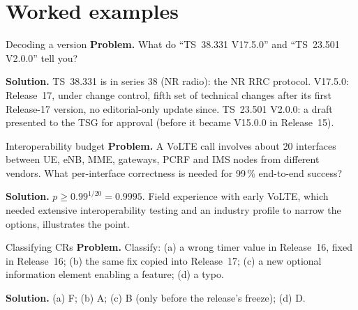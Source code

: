 \documentclass[11pt,a4paper]{article}
\begin{document}
\section{Worked examples}

\begin{examplebox}{Decoding a version}\label{ex:version}
\textbf{Problem.} What do ``TS~38.331 V17.5.0'' and ``TS~23.501 V2.0.0'' tell you?

\textbf{Solution.} TS~38.331 is in series 38 (NR radio): the NR RRC protocol. V17.5.0: Release~17, under change control,
fifth set of technical changes after its first Release-17 version, no editorial-only update since. TS~23.501 V2.0.0: a draft
presented to the TSG for approval (before it became V15.0.0 in Release~15).
\end{examplebox}

\begin{examplebox}{Interoperability budget}\label{ex:interop}
\textbf{Problem.} A VoLTE call involves about 20 interfaces between UE, eNB, MME, gateways, PCRF and IMS nodes from
different vendors. What per-interface correctness is needed for 99\,\% end-to-end success?

\textbf{Solution.} $p \ge 0.99^{1/20} = 0.9995$. Field experience with early VoLTE, which needed extensive interoperability
testing and an industry profile to narrow the options, illustrates the point.
\end{examplebox}

\begin{examplebox}{Classifying CRs}\label{ex:cr}
\textbf{Problem.} Classify: (a) a wrong timer value in Release~16, fixed in Release~16; (b) the same fix copied into
Release~17; (c) a new optional information element enabling a feature; (d) a typo.

\textbf{Solution.} (a) F; (b) A; (c) B (only before the release's freeze); (d) D.
\end{examplebox}

\end{document}
